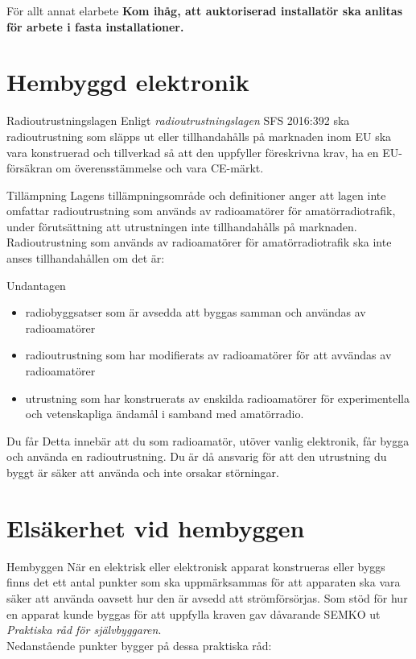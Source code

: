 \documentclass{beamer}
\begin{document}
\begin{frame}{För allt annat elarbete}
\textbf{Kom ihåg, att auktoriserad installatör ska anlitas för arbete
	i fasta installationer.}
\end{frame}

\section{Hembyggd elektronik}

\begin{frame}{Radioutrustningslagen}
Enligt \emph{radioutrustningslagen} SFS 2016:392 ska radioutrustning som släpps
ut eller tillhandahålls på marknaden inom EU ska vara konstruerad och tillverkad
så att den uppfyller föreskrivna krav, ha en EU-försäkran om överensstämmelse
och vara CE-märkt.
\end{frame}

\begin{frame}{Tillämpning}
Lagens tillämpningsområde och definitioner anger att lagen inte omfattar
radioutrustning som används av radioamatörer för amatörradiotrafik, under
förutsättning att utrustningen inte tillhandahålls på marknaden.
Radioutrustning som används av radioamatörer för amatörradiotrafik ska inte
anses tillhandahållen om det är:
\end{frame}

\begin{frame}{Undantagen}
\begin{itemize}
	\item radiobyggsatser som är avsedda att byggas samman och användas av
	radioamatörer
	\item radioutrustning som har modifierats av radioamatörer för att
	avvändas av radioamatörer
	\item utrustning som har konstruerats av enskilda radioamatörer för
	experimentella och vetenskapliga ändamål i samband med amatörradio.
\end{itemize}
\end{frame}

\begin{frame}{Du får}
Detta innebär att du som radioamatör, utöver vanlig elektronik, får bygga
och använda en radioutrustning.
Du är då ansvarig för att den utrustning du byggt är säker att använda och inte
orsakar störningar.
\end{frame}

\section{Elsäkerhet vid hembyggen}
\begin{frame}{Hembyggen}
När en elektrisk eller elektronisk apparat konstrueras eller byggs finns det
ett antal punkter som ska uppmärksammas för att apparaten ska vara säker att
använda oavsett hur den är avsedd att strömförsörjas.
Som stöd för hur en apparat kunde byggas för att uppfylla kraven gav
dåvarande SEMKO ut \emph{Praktiska råd för självbyggaren}.\\
\vspace{5mm}
Nedanstående punkter bygger på dessa praktiska råd:
\end{frame}
\end{document}
